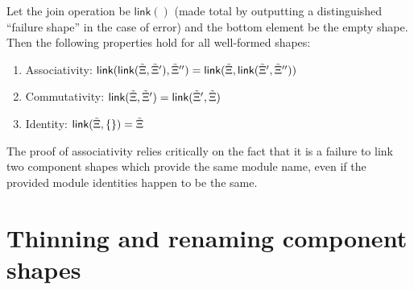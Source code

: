 \begin{lemma} \normalfont{}
Let the join operation be $\textsf{link}()$ (made total by outputting a distinguished ``failure shape'' in the case of error) and the bottom element be the empty shape.  Then the following properties hold for all well-formed shapes:
\begin{enumerate}
    \item Associativity: $\textsf{link}(\textsf{link}({\tilde{\Xi}}, {\tilde{\Xi}}'), {\tilde{\Xi}}'') = \textsf{link}({\tilde{\Xi}}, \textsf{link}({\tilde{\Xi}}', {\tilde{\Xi}}''))$
    \item Commutativity: $\textsf{link}({\tilde{\Xi}}, {\tilde{\Xi}}') = \textsf{link}({\tilde{\Xi}}', {\tilde{\Xi}})$
    \item Identity: $\textsf{link}({\tilde{\Xi}}, \{\}) = {\tilde{\Xi}}$
\end{enumerate}
\end{lemma}

The proof of associativity relies critically on the fact that it is a failure
to link two component shapes which provide the same module name, even if the
provided module identities happen to be the same.

\section{Thinning and renaming component shapes}




